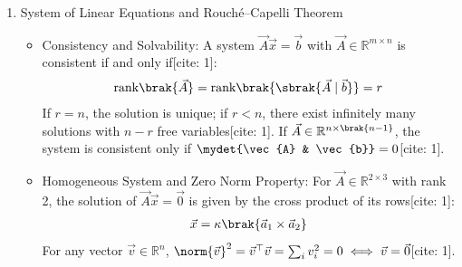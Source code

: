 \begin{enumerate}[label=\thesubsection.\arabic*, ref=\thesubsection.\theenumi,itemsep=0pt]
\begin{itemize}
\item Angle Between Vectors:
The angle $\theta$ between two vectors $\vec{a}$ and $\vec{b}$ is given by[cite: 1]:
\begin{align}
\cos\theta = \frac{\vec{a}^\top \vec{b}}{\norm{\vec{a}}\norm{\vec{b}}}
\end{align}
Two vectors are orthogonal if and only if $\vec{a}^\top \vec{b} = 0$[cite: 1].

\item Circle Representation and Chords:
A point on a circle of radius $r$ centered at the origin is $\vec{x} = r \myvec{\cos\alpha \\ \sin\alpha}$ with $\vec{e}_\alpha \triangleq \myvec{\cos\alpha \\ \sin\alpha}$[cite: 1]. The chord length between $\vec{x}_\alpha = r\vec{e}_\alpha$ and $\vec{x}_\beta = r\vec{e}_\beta$ satisfies[cite: 1]:
\begin{align}
\norm{\vec{x}_\alpha - \vec{x}_\beta}^2 = 2r^2 \brak{1 - \vec{e}_\alpha^\top \vec{e}_\beta} = 4r^2 \sin^2 \frac{\alpha - \beta}{2}
\end{align}
\end{itemize}

\item System of Linear Equations and Rouch\'{e}--Capelli Theorem
\begin{itemize}
\item Consistency and Solvability:
A system $\vec{A}\vec{x} = \vec{b}$ with $\vec{A} \in \mathbb{R}^{m \times n}$ is consistent if and only if[cite: 1]:
\begin{align}
\text{rank}\brak{\vec{A}} = \text{rank}\brak{\sbrak{\vec{A} \mid \vec{b}}} = r
\end{align}
If $r = n$, the solution is unique; if $r < n$, there exist infinitely many solutions with $n - r$ free variables[cite: 1]. If $\vec{A} \in \mathbb{R}^{n \times \brak{n-1}}$, the system is consistent only if $\mydet{\vec{A} & \vec{b}} = 0$[cite: 1].

\item Homogeneous System and Zero Norm Property:
For $\vec{A} \in \mathbb{R}^{2 \times 3}$ with rank 2, the solution of $\vec{A}\vec{x} = \vec{0}$ is given by the cross product of its rows[cite: 1]:
\begin{align}
\vec{x} = \kappa \brak{\vec{a}_1 \times \vec{a}_2}
\end{align}
For any vector $\vec{v} \in \mathbb{R}^n$, $\norm{\vec{v}}^2 = \vec{v}^\top \vec{v} = \sum_i v_i^2 = 0 \iff \vec{v} = \vec{0}$[cite: 1].
\end{itemize}


\end{enumerate}
